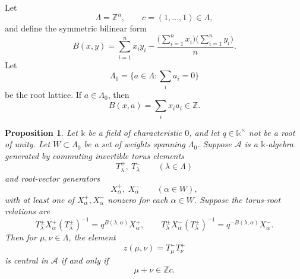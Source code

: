 \documentclass[12pt]{article}
\theoremstyle{plain}
\newtheorem{proposition}[theorem]{Proposition}
\theoremstyle{definition}
\numberwithin{equation}{section}
\begin{document}
Let
\[
\Lambda=\mathbb Z^n,
\qquad
c=(1,\dots,1)\in\Lambda,
\]
and define the symmetric bilinear form
\[
B(x,y)
=
\sum_{i=1}^n x_i y_i
-
\frac{\bigl(\sum_{i=1}^n x_i\bigr)\bigl(\sum_{i=1}^n y_i\bigr)}{n}.
\]
Let
\[
\Lambda_0=\bigl\{a\in\Lambda:\sum_i a_i=0\bigr\}
\]
be the root lattice.  If \(a\in\Lambda_0\), then
\[
B(x,a)=\sum_i x_i a_i\in\mathbb Z.
\]

\begin{proposition}\label{prop:centrality-criterion}
Let \(\mathbb{k}\) be a field of characteristic \(0\), and let \(q\in\mathbb{k}^\times\) not be a root of unity.  Let \(W\subset\Lambda_0\) be a set of weights spanning \(\Lambda_0\).  Suppose \(\mathcal A\) is a \(\mathbb{k}\)-algebra generated by commuting invertible torus elements
\[
T^+_\lambda,\ T^-_\lambda
\qquad
(\lambda\in\Lambda)
\]
and root-vector generators
\[
X^+_\alpha,\ X^-_\alpha
\qquad
(\alpha\in W),
\]
with at least one of \(X^+_\alpha,X^-_\alpha\) nonzero for each \(\alpha\in W\).  Suppose the torus-root relations are
\[
T^\pm_\lambda X^+_\alpha (T^\pm_\lambda)^{-1}
=
q^{B(\lambda,\alpha)}X^+_\alpha,
\qquad
T^\pm_\lambda X^-_\alpha (T^\pm_\lambda)^{-1}
=
q^{-B(\lambda,\alpha)}X^-_\alpha.
\]
Then for \(\mu,\nu\in\Lambda\), the element
\[
z(\mu,\nu)=T^-_\mu T^+_\nu
\]
is central in \(\mathcal A\) if and only if
\[
\mu+\nu\in \mathbb Z c.
\]
\end{proposition}
\end{document}
